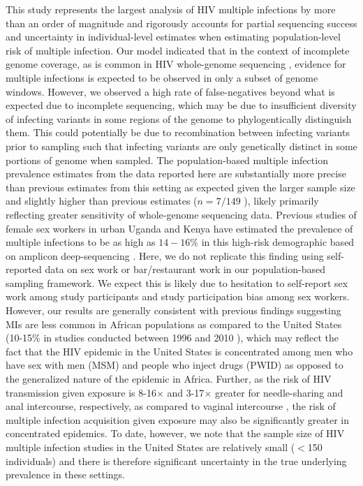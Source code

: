 \documentclass[10pt,letterpaper]{article}
\begin{document}
This study represents the largest analysis of HIV multiple infections by more than an order of magnitude \cite{yuan2024} and rigorously accounts for partial sequencing success and uncertainty in individual-level estimates when estimating population-level risk of multiple infection. Our model indicated that in the context of incomplete genome coverage, as is common in HIV whole-genome sequencing \cite{bonsall2020}, evidence for multiple infections is expected to be observed in only a subset of genome windows. However, we observed a high rate of false-negatives beyond what is expected due to incomplete sequencing, which may be due to insufficient diversity of infecting variants in some regions of the genome \cite{patino2017} to phylogentically distinguish them. This could potentially be due to recombination between infecting variants prior to sampling \cite{shriner2004, song2018} such that infecting variants are only genetically distinct in some portions of genome when sampled. The population-based multiple infection prevalence estimates from the data reported here are substantially more precise than previous estimates from this setting as expected given the larger sample size and slightly higher than previous estimates ($n=7/149$ \cite{redd2012}), likely primarily reflecting greater sensitivity of whole-genome sequencing data. Previous studies of female sex workers in urban Uganda and Kenya have estimated the prevalence of multiple infections to be as high as $14-16\%$ in this high-risk demographic based on amplicon deep-sequencing \cite{ronen2013,redd2014}. Here, we do not replicate this finding using self-reported data on sex work or bar/restaurant work in our population-based sampling framework. We expect this is likely due to hesitation to self-report sex work among study participants and study participation bias among sex workers. However, our results are generally consistent with previous findings suggesting MIs are less common in African populations as compared to the United States (10-15\% in studies conducted between 1996 and 2010 \cite{pacold2012,wagner2013,wagner2014,wagner2016,vesa2017}), which may reflect the fact that the HIV epidemic in the United States is concentrated among men who have sex with men (MSM) and people who inject drugs (PWID) as opposed to the generalized nature of the epidemic in Africa. Further, as the risk of HIV transmission given exposure is 8-16$\times$ and 3-17$\times$ greater for needle-sharing and anal intercourse, respectively, as compared to vaginal intercourse \cite{patel2014}, the risk of multiple infection acquisition given exposure may also be significantly greater in concentrated epidemics. To date, however, we note that the sample size of HIV multiple infection studies in the United States are relatively small ($<$150 individuals) and there is therefore significant uncertainty in the true underlying prevalence in these settings. \par
\end{document}
